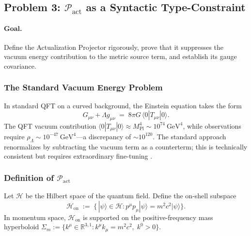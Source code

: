 \documentclass[11pt,a4paper]{article}
\theoremstyle{plain}
\theoremstyle{definition}
\theoremstyle{remark}
\newcommand{\Pact}{\mathcal{P}_{\mathrm{act}}}
\newcommand{\Hon}{\mathcal{H}_{\mathrm{on}}}
\newcommand{\Sigmam}{\Sigma_{m}}
\newcommand{\ket}[1]{|#1\rangle}
\begin{document}
\subsection{Problem 3: \texorpdfstring{$\Pact$}{P\_act} as a Syntactic Type-Constraint}
\label{sec:pact}

\paragraph{Goal.} Define the Actualization Projector rigorously, prove that it
suppresses the vacuum energy contribution to the metric source term, and establish
its gauge covariance.

\subsubsection{The Standard Vacuum Energy Problem}

In standard QFT on a curved background, the Einstein equation takes the form
\begin{equation}
  G_{\mu\nu} + \Lambda g_{\mu\nu}
  \;=\;
  8\pi G\,\langle 0 | T_{\mu\nu} | 0 \rangle.
\end{equation}
The QFT vacuum contribution $\langle 0|T_{\mu\nu}|0\rangle \approx M_{\mathrm{Pl}}^{4}
\sim 10^{74}~\mathrm{GeV}^{4}$, while observations require $\rho_{\Lambda} \sim
10^{-47}~\mathrm{GeV}^{4}$---a discrepancy of $\sim\!10^{120}$. The standard approach
renormalizes by subtracting the vacuum term as a counterterm; this is technically
consistent but requires extraordinary fine-tuning \citep{Weinberg1989}.

\subsubsection{Definition of \texorpdfstring{$\Pact$}{P\_act}}

Let $\mathcal{H}$ be the Hilbert space of the quantum field. Define the on-shell
subspace
\begin{equation}
  \Hon
  \;:=\;
  \bigl\{\,\ket{\psi} \in \mathcal{H} :
    p^{\mu}p_{\mu}\ket{\psi} = m^{2}c^{2}\ket{\psi}
  \bigr\}.
\end{equation}
In momentum space, $\Hon$ is supported on the positive-frequency mass hyperboloid
$\Sigmam := \{k^{\mu} \in \mathbb{R}^{3,1} : k^{\mu}k_{\mu} = m^{2}c^{2},\;
k^{0} > 0\}$.
\end{document}
